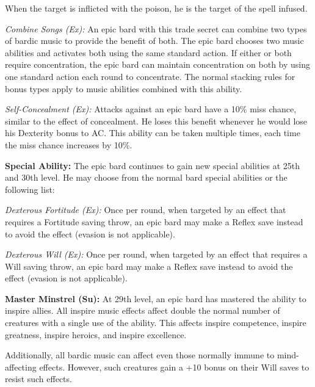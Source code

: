 When the target is inflicted with the poison, he is the target of the spell infused.

\textit{Combine Songs (Ex):} An epic bard with this trade secret can combine two types of bardic music to provide the benefit of both. The epic bard chooses two music abilities and activates both using the same standard action. If either or both require concentration, the epic bard can maintain concentration on both by using one standard action each round to concentrate. The normal stacking rules for bonus types apply to music abilities combined with this ability.


\textit{Self-Concealment (Ex):} Attacks against an epic bard have a 10\% miss chance, similar to the effect of concealment. He loses this benefit whenever he would lose his Dexterity bonus to AC. This ability can be taken multiple times, each time the miss chance increases by 10\%.


\textbf{Special Ability:} The epic bard continues to gain new special abilities at 25th and 30th level. He may choose from the normal bard special abilities or the following list:

\textit{Dexterous Fortitude (Ex):} Once per round, when targeted by an effect that requires a Fortitude saving throw, an epic bard may make a Reflex save instead to avoid the effect (evasion is not applicable).

\textit{Dexterous Will (Ex):} Once per round, when targeted by an effect that requires a Will saving throw, an epic bard may make a Reflex save instead to avoid the effect (evasion is not applicable).

\textbf{Master Minstrel (Su):} At 29th level, an epic bard has mastered the ability to inspire allies. All inspire music effects affect double the normal number of creatures with a single use of the ability. This affects inspire competence, inspire greatness, inspire heroics, and inspire excellence.

Additionally, all bardic music can affect even those normally immune to mind-affecting effects. However, such creatures gain a +10 bonus on their Will saves to resist such effects.
